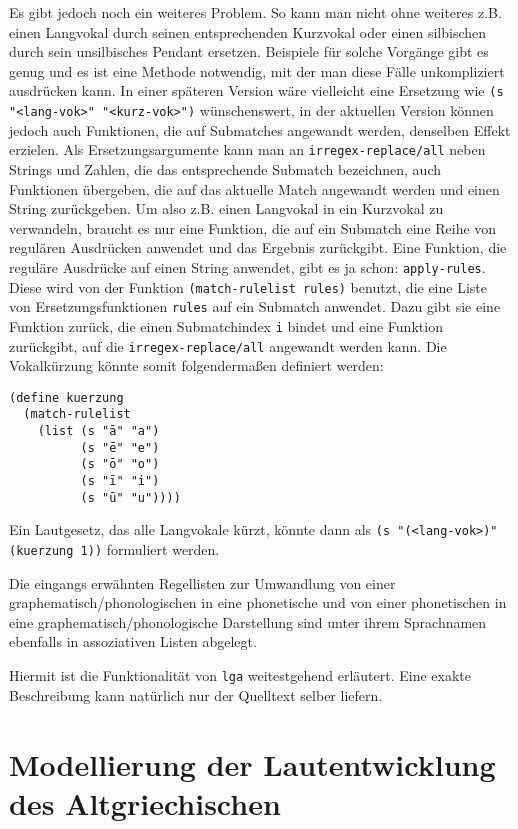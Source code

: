 \documentclass[12pt,a4paper,normalheadings]{scrartcl}
\def\tt#1{\texttt{#1}}
\begin{document}
Es gibt jedoch noch ein weiteres Problem.
So kann man nicht ohne weiteres z.B. einen Langvokal durch seinen
entsprechenden Kurzvokal oder einen silbischen durch sein unsilbisches
Pendant ersetzen.
Beispiele für solche Vorgänge gibt es genug und es ist eine Methode notwendig,
mit der man diese Fälle unkompliziert ausdrücken kann.
In einer späteren Version wäre vielleicht eine Ersetzung wie
\tt{(s "<lang-vok>" "<kurz-vok>")} wünschenswert,
in der aktuellen Version können jedoch auch Funktionen,
die auf Submatches angewandt werden, denselben Effekt erzielen.
Als Ersetzungsargumente kann man an \tt{irregex-replace/all}
neben Strings und Zahlen, die das entsprechende Submatch bezeichnen,
auch Funktionen übergeben,
die auf das aktuelle Match angewandt werden und einen String zurückgeben.
Um also z.B. einen Langvokal in ein Kurzvokal zu verwandeln,
braucht es nur eine Funktion,
die auf ein Submatch eine Reihe von regulären Ausdrücken anwendet
und das Ergebnis zurückgibt.
Eine Funktion, die reguläre Ausdrücke auf einen String anwendet,
gibt es ja schon: \tt{apply-rules}.
Diese wird von der Funktion \tt{(match-rulelist rules)} benutzt,
die eine Liste von Ersetzungsfunktionen \tt{rules}
auf ein Submatch anwendet.
Dazu gibt sie eine Funktion zurück,
die einen Submatchindex \tt{i} bindet und eine Funktion zurückgibt,
auf die \tt{irregex-replace/all} angewandt werden kann.
Die Vokalkürzung könnte somit folgendermaßen definiert werden:
\begin{verbatim}
(define kuerzung
  (match-rulelist
    (list (s "ā" "a")
          (s "ē" "e")
          (s "ō" "o")
          (s "ī" "i")
          (s "ū" "u"))))
\end{verbatim}
Ein Lautgesetz, das alle Langvokale kürzt,
könnte dann als \tt{(s "(<lang-vok>)" (kuerzung 1))} formuliert werden.

Die eingangs erwähnten Regellisten zur Umwandlung von einer
graphematisch/phonologischen in eine phonetische und von
einer phonetischen in eine graphematisch/phonologische Darstellung
sind unter ihrem Sprachnamen ebenfalls in
assoziativen Listen abgelegt.

Hiermit ist die Funktionalität von \tt{lga} weitestgehend erläutert.
Eine exakte Beschreibung kann natürlich nur der Quelltext selber liefern.

\section{Modellierung der Lautentwicklung des Altgriechischen}
\end{document}
